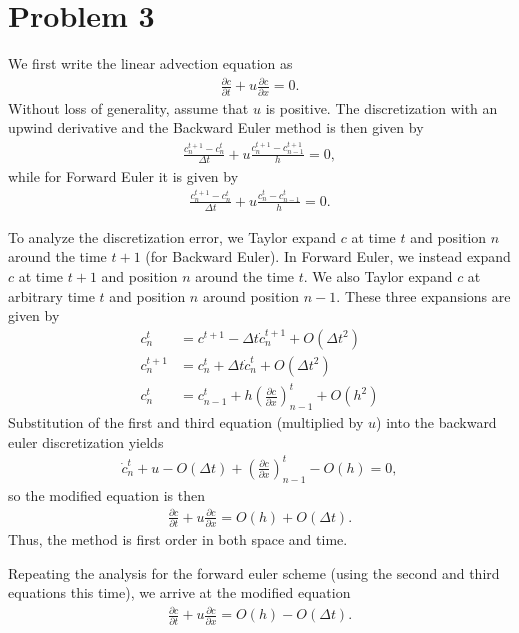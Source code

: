 \documentclass{article}
\begin{document}
\section{Problem 3}
We first write the linear advection equation as
\begin{align}
    \frac{\partial c}{\partial t} + u \frac{\partial c}{\partial x} = 0.
\end{align}
Without loss of generality, assume that $u$ is positive. The discretization with an upwind derivative and the Backward Euler method is then given by
\begin{align}
    \frac{c^{t+1}_n - c^t_n}{\Delta t} + u \frac{c^{t+1}_n - c^{t+1}_{n-1}}{h} = 0,
\end{align}
while for Forward Euler it is given by
\begin{align}
    \frac{c^{t+1}_n - c^t_n}{\Delta t} + u \frac{c^{t}_n - c^{t}_{n-1}}{h} = 0.
\end{align}

To analyze the discretization error, we Taylor expand $c$ at time $t$ and position $n$ around the time $t+1$ (for Backward Euler).
In Forward Euler, we instead expand $c$ at time $t+1$ and position $n$ around the time $t$.
We also Taylor expand $c$ at arbitrary time $t$ and position $n$ around position $n-1$. These three expansions are given by
\begin{align}
    c^{t}_{n} &= c^{t+1} - \Delta t \dot{c}^{t+1}_n + O(\Delta t^2) \\
    c^{t+1}_{n} &= c^{t}_n + \Delta t \dot{c}^{t}_n + O(\Delta t^2) \\
    c^{t}_{n} &= c^{t}_{n-1} + h \left( \frac{\partial c}{\partial x} \right)^{t}_{n-1} + O(h^2)
\end{align}
Substitution of the first and third equation (multiplied by $u$) into the backward euler discretization yields
\begin{align}
    \dot{c}^{t}_n + u - O(\Delta t) + \left( \frac{\partial c}{\partial x} \right)^{t}_{n-1} - O(h) = 0,
\end{align}
so the modified equation is then
\begin{align}
    \frac{\partial c}{\partial t} + u \frac{\partial c}{\partial x} = O(h) + O(\Delta t).
\end{align}
Thus, the method is first order in both space and time.

Repeating the analysis for the forward euler scheme (using the second and third equations this time), we arrive at the modified equation
\begin{align}
    \frac{\partial c}{\partial t} + u \frac{\partial c}{\partial x} = O(h) - O(\Delta t).
\end{align}
\end{document}
